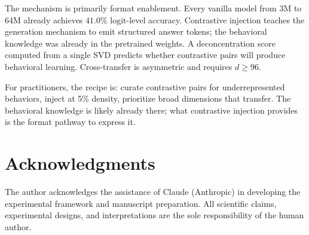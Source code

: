 \documentclass[11pt]{article}
\begin{document}
The mechanism is primarily format enablement. Every vanilla model from 3M to 64M already achieves $41.0\%$ logit-level accuracy. Contrastive injection teaches the generation mechanism to emit structured answer tokens; the behavioral knowledge was already in the pretrained weights. A deconcentration score computed from a single SVD predicts whether contrastive pairs will produce behavioral learning. Cross-transfer is asymmetric and requires $d \geq 96$.

For practitioners, the recipe is: curate contrastive pairs for underrepresented behaviors, inject at 5\% density, prioritize broad dimensions that transfer. The behavioral knowledge is likely already there; what contrastive injection provides is the format pathway to express it.


\section*{Acknowledgments}

The author acknowledges the assistance of Claude (Anthropic) in developing the experimental framework and manuscript preparation. All scientific claims, experimental designs, and interpretations are the sole responsibility of the human author.




\end{document}
